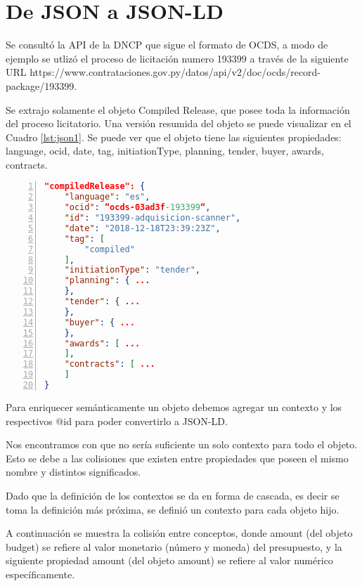 \section{De JSON a JSON-LD}


Se consultó la API de la DNCP que sigue el formato de OCDS, a modo de ejemplo se utlizó el proceso de licitación numero 193399 a través de la siguiente URL https://www.contrataciones.gov.py/datos/api/v2/doc/ocds/record-package/193399.

Se extrajo solamente el objeto Compiled Release, que posee toda la información del proceso licitatorio. Una versión resumida del objeto se puede visualizar en el Cuadro \ref{lst:json1}. Se puede ver que el objeto tiene las siguientes propiedades: language, ocid, date, tag, initiationType, planning, tender, buyer, awards, contracts.\hfill \break

\noindent\begin{minipage}{\textwidth}
\begin{lstlisting}[captionpos=b, caption=Objeto JSON del OCDS de un Compiled Release, label=lst:json1,  numbers=left, language=json, numberstyle=\tiny\color{mygray},frame=single]
"compiledRelease": {
    "language": "es",
    "ocid": “ocds-03ad3f-193399“,
    "id": "193399-adquisicion-scanner",
    "date": "2018-12-18T23:39:23Z",
    "tag": [
        "compiled"
    ],
    "initiationType": "tender",
    "planning": { ...
    },
    "tender": { ...
    },
    "buyer": { ...
    },
    "awards": [ ...
    ],
    "contracts": [ ...
    ]
}
\end{lstlisting}
\end{minipage}


Para enriquecer semánticamente un objeto debemos agregar un contexto y los respectivos @id para poder convertirlo a JSON-LD. 

Nos encontramos con que no sería suficiente un solo contexto para todo el objeto. Esto se debe a las colisiones que existen entre propiedades que poseen el mismo nombre y distintos significados.

Dado que la definición de los contextos se da en forma de cascada, es decir se toma la definición más próxima, se definió un contexto para cada objeto hijo.

A continuación se muestra la colisión entre conceptos, donde amount (del objeto budget) se refiere al valor monetario (número y moneda) del presupuesto, y la siguiente propiedad amount (del objeto amount) se refiere al valor numérico específicamente.\hfill \break

